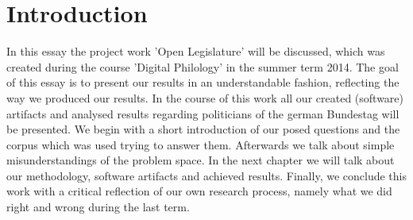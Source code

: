 \documentclass[12pt,paper=a4,nenglish]{scrreprt}
\begin{document}

\renewcommand*\contentsname{Table of contents}
\tableofcontents
\onehalfspacing

\setcounter{page}{1} 
\chapter{Introduction}
In this essay the project work 'Open Legislature' will be discussed, which was
created during the course 'Digital Philology' in the summer term 2014.
The goal of this essay is to present our results in an understandable fashion,
reflecting the way we produced our results. 
In the course of this work all our created (software) artifacts and analysed results
regarding politicians of the german Bundestag will be presented.
We begin with a short introduction of our posed questions and the corpus which
was used trying to answer them. Afterwards we talk about simple
misunderstandings of the problem space. 
In the next chapter we will talk
about our methodology, software artifacts and achieved results.
Finally, we conclude this work with a critical reflection of our own research
process, namely what we did right and wrong during the last term.
\end{document}
